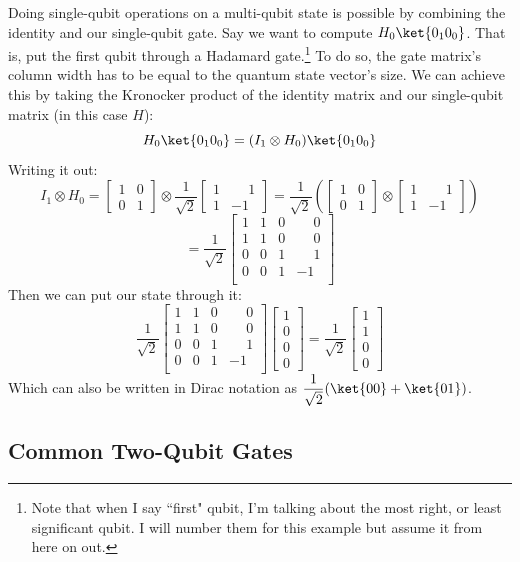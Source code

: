 \documentclass[11pt]{article}
\newcommand{\igate}{
  \begin{bmatrix}
  1 & 0 \\
  0 & 1 
  \end{bmatrix}
}
\newcommand{\hgate}{
  \dfrac{1}{\sqrt2}
  \begin{bmatrix}
  1 & \phantom{-}1 \\
  1 & -1
  \end{bmatrix}
}
\begin{document}
Doing single-qubit operations on a multi-qubit state is possible by combining the identity and our single-qubit gate. Say we want to compute $H_0\ket{0_1 0_0}$. That is, put the first qubit through a Hadamard gate.\footnote{Note that when I say ``first" qubit, I'm talking about the most right, or least significant qubit. I will number them for this example but assume it from here on out.} To do so, the gate matrix's column width has to be equal to the quantum state vector's size. We can achieve this by taking the Kronocker product of the identity matrix and our single-qubit matrix (in this case $H$):
\[
  H_0\ket{0_1 0_0} = (I_1 \otimes H_0)\ket{0_1 0_0}
\]
Writing it out:
\[
I_1 \otimes H_0 = 
  \igate{} \otimes \hgate{}
  =
  \dfrac{1}{\sqrt2}
  \left(
  \igate{}
  \otimes
  \begin{bmatrix}
  1 & \phantom{-}1 \\
  1 & -1
  \end{bmatrix}
  \right)
\]
\[
= \dfrac{1}{\sqrt2}
  \begin{bmatrix}
  1 & 1 & 0 & \phantom{-}0 \\
  1 & 1 & 0 & \phantom{-}0 \\
  0 & 0 & 1 & \phantom{-}1 \\
  0 & 0 & 1 & -1 \\
  \end{bmatrix}
\]
Then we can put our state  through it:
\[
  \dfrac{1}{\sqrt2}
  \begin{bmatrix}
  1 & 1 & 0 & \phantom{-}0 \\
  1 & 1 & 0 & \phantom{-}0 \\
  0 & 0 & 1 & \phantom{-}1 \\
  0 & 0 & 1 & -1 \\
  \end{bmatrix}
  \begin{bmatrix}
    1 \\
    0 \\
    0 \\
    0
  \end{bmatrix}
  =
  \dfrac{1}{\sqrt2}
  \begin{bmatrix}
    1 \\
    1 \\
    0 \\
    0
  \end{bmatrix}
\]
Which can also be written in Dirac notation as $\dfrac{1}{\sqrt2}(\ket{00} + \ket{01})$.
\subsection{Common Two-Qubit Gates}
\end{document}
